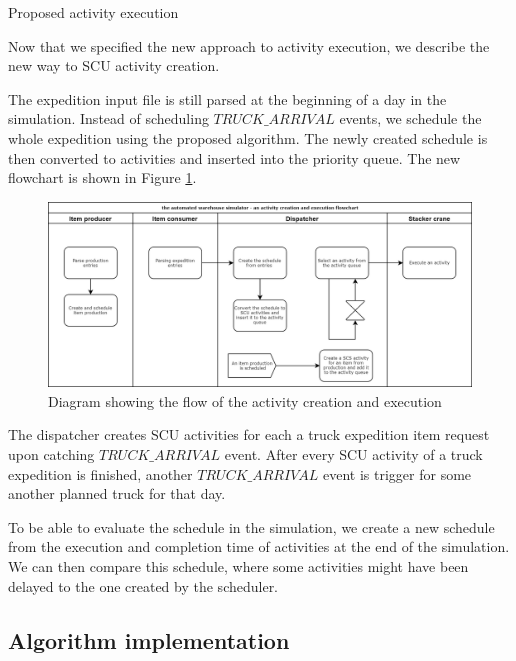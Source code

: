 \documentclass{ctuthesis}
\begin{document}
\begin{algorithm}[H]
\SetAlgoLined
{
}
\caption{Proposed activity execution}
\label{alg:activityexec2}
\end{algorithm}

Now that we specified the new approach to activity execution, we describe the new way to SCU activity creation. 

The expedition input file is still parsed at the beginning of a day in the simulation. Instead of scheduling $TRUCK\_ARRIVAL$ events, we schedule the whole expedition using the proposed algorithm. The newly created schedule is then converted to activities and inserted into the priority queue. The new flowchart is shown in Figure \ref{flowchartNew}. 

\begin{figure}[H]
\includegraphics[width=1\linewidth]{flowchartNew.png}
\caption{Diagram showing the flow of the activity creation and execution}
\label{flowchartNew}
\end{figure}

The dispatcher creates SCU activities for each a truck expedition item request upon catching $TRUCK\_ARRIVAL$ event. After every SCU activity of a truck expedition is finished, another $TRUCK\_ARRIVAL$ event is trigger for some another planned truck for that day.  

To be able to evaluate the schedule in the simulation, we create a new schedule from the execution and completion time of activities at the end of the simulation. We can then compare this schedule, where some activities might have been delayed to the one created by the scheduler. 

\subsection{Algorithm implementation}
\end{document}

